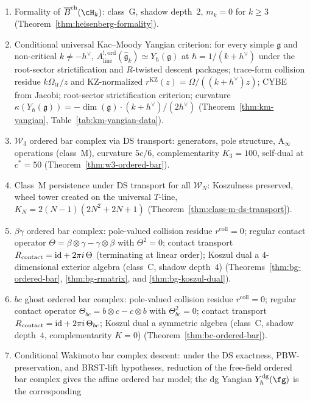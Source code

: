 \begin{enumerate}[label=(\arabic*)]
of $\cH_k$ (Theorem~\ref{thm:heisenberg-yangian}).
\item Formality of $\Barch(\cH_k)$: class~G, shadow depth~$2$,
$m_k = 0$ for $k\ge 3$ (Theorem~\ref{thm:heisenberg-formality}).
\item Conditional universal Kac--Moody Yangian criterion: for every simple
$\mathfrak{g}$ and non-critical $k\neq -h^\vee$,
$A^{!,\mathrm{ord}}_{\mathrm{line}}
(\widehat{\mathfrak{g}}_k)\simeq Y_\hbar(\mathfrak{g})$
at $\hbar = 1/(k+h^\vee)$ under the root-sector strictification
and $R$-twisted descent packages; trace-form collision residue
$k\Omega_{\mathrm{tr}}/z$ and KZ-normalized
$r^{\mathrm{KZ}}(z)=\Omega/((k+h^\vee)z)$; CYBE from Jacobi;
root-sector strictification criterion; curvature
$\kappa(Y_\hbar(\mathfrak{g})) = -\dim(\mathfrak{g})\cdot
(k+h^\vee)/(2h^\vee)$
(Theorem~\ref{thm:km-yangian},
Table~\ref{tab:km-yangian-data}).
\item $\mathcal{W}_3$ ordered bar complex via DS transport: generators,
pole structure, A$_\infty$ operations (class~M), curvature $5c/6$,
complementarity $K_3 = 100$, self-dual at $c^* = 50$
(Theorem~\ref{thm:w3-ordered-bar}).
\item Class~M persistence under DS transport for all $\mathcal{W}_N$:
Koszulness preserved, wheel tower created on the universal $T$-line,
$K_N = 2(N{-}1)(2N^2{+}2N{+}1)$
(Theorem~\ref{thm:class-m-ds-transport}).
\item $\beta\gamma$ ordered bar complex: pole-valued collision residue
$r^{\mathrm{coll}}=0$; regular contact operator
$\Theta = \beta\otimes\gamma - \gamma\otimes\beta$ with $\Theta^2 = 0$;
contact transport $R_{\mathrm{contact}} = \mathrm{id} + 2\pi i\,\Theta$
(terminating at linear order); Koszul dual a $4$-dimensional exterior
algebra (class~C, shadow depth~$4$)
(Theorems~\ref{thm:bg-ordered-bar}, \ref{thm:bg-rmatrix},
and \ref{thm:bg-koszul-dual}).
\item $bc$ ghost ordered bar complex: pole-valued collision residue
$r^{\mathrm{coll}}=0$; regular contact operator
$\Theta_{bc} = b\otimes c - c\otimes b$ with $\Theta_{bc}^2 = 0$;
contact transport $R_{\mathrm{contact}} = \mathrm{id} + 2\pi i\,\Theta_{bc}$;
Koszul dual a symmetric algebra (class~C, shadow depth~$4$, complementarity
$K = 0$) (Theorem~\ref{thm:bc-ordered-bar}).
\item Conditional Wakimoto bar complex descent: under the DS exactness,
PBW-preservation, and BRST-lift hypotheses, reduction of the
free-field ordered bar complex gives the affine ordered bar model; the
dg Yangian $Y^{\mathrm{dg}}_\hbar(\fg)$ is the corresponding

\end{enumerate}
